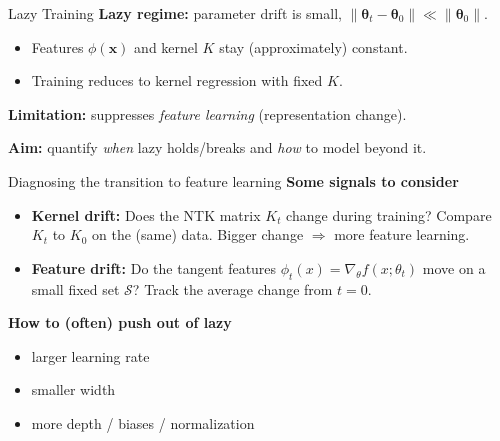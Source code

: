 \documentclass[10pt,aspectratio=169]{beamer}
\newcommand{\btheta}{\boldsymbol{\theta}}
\newcommand{\bx}{\boldsymbol{x}}
\begin{document}
\begin{frame}{Lazy Training}
	\textbf{Lazy regime:} parameter drift is small, $\|\btheta_t-\btheta_0\|\ll \|\btheta_0\|$.
	\begin{itemize}
		\item Features $\phi(\bx)$ and kernel $K$ stay (approximately) constant.
		\item Training reduces to kernel regression with fixed $K$.
	\end{itemize}
	\textbf{Limitation:} suppresses \emph{feature learning} (representation change).
	\medskip

	\textbf{Aim:} quantify \emph{when} lazy holds/breaks and \emph{how} to model beyond it.
\end{frame}
\begin{frame}{Diagnosing the transition to feature learning}
	\textbf{Some signals to consider}
	\begin{itemize}
		\item \textbf{Kernel drift:} Does the NTK matrix $K_t$ change during training?
		      Compare $K_t$ to $K_0$ on the (same) data. Bigger change $\Rightarrow$ more feature learning.
		      \pause
		\item \textbf{Feature drift:} Do the tangent features
		      $\phi_t(x)=\nabla_\theta f(x;\theta_t)$ move on a small fixed set $\mathcal S$?
		      Track the average change from $t=0$.
	\end{itemize}

	\pause
	\medskip
	\textbf{How to (often) push out of lazy}
	\begin{itemize}
		\item larger learning rate \hfill \item smaller width \hfill \item more depth / biases / normalization
	\end{itemize}

\end{frame}
\end{document}
